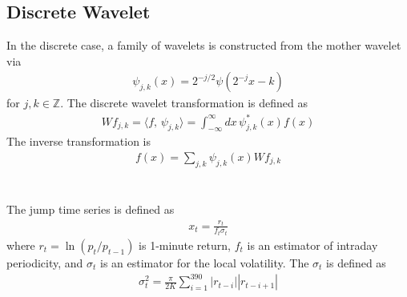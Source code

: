 \documentclass[11pt,a4paper]{article}
\begin{document}

\subsection{Discrete Wavelet}
In the discrete case, a family of wavelets is constructed from the mother wavelet via
\begin{align}
\psi_{j,k}(x) = 2^{-j / 2} \psi( 2^{-j} x - k)
\end{align}
for $j, k \in {\mathbb Z}$. The discrete wavelet transformation is defined as
\begin{align}
W f_{j,k} = \langle f,\, \psi_{j,k}  \rangle
= \int_{-\infty}^{\infty} dx \, \psi^*_{j,k}(x) f(x) 
\end{align}
The inverse transformation is 
\begin{align}
f(x) = \sum_{j,k} \psi_{j,k}(x) Wf_{j,k}
\end{align}



\appendix
\section{}

The jump time series is defined as
\begin{align}
x_t
= 
\frac{r_t}{f_t \sigma_t}
\end{align}
where $r_t = \ln( p_t / p_{t-1})$ is 1-minute return, $f_t$ is an estimator of intraday periodicity, and $\sigma_t$ is an estimator for the local volatility. The $\sigma_t$ is defined as
\begin{align}
\sigma_t^2
= \frac{\pi}{2 K}
\sum_{i=1}^{390} 
|r_{t-i}| |r_{t-i+1}|
\end{align}





\end{document}
